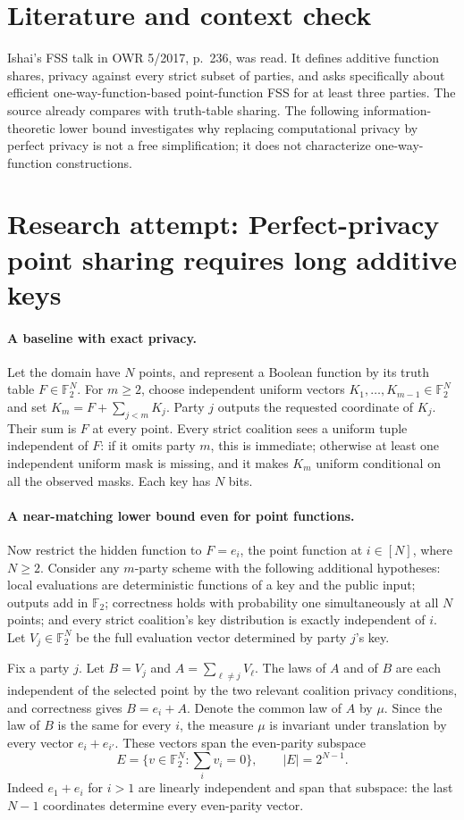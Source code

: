 \documentclass[11pt]{article}
\begin{document}
\section{Literature and context check}
Ishai's FSS talk in OWR 5/2017, p.~236, was read. It defines additive function shares, privacy against every strict subset of parties, and asks specifically about efficient one-way-function-based point-function FSS for at least three parties. The source already compares with truth-table sharing. The following information-theoretic lower bound investigates why replacing computational privacy by perfect privacy is not a free simplification; it does not characterize one-way-function constructions.
\section{Research attempt: Perfect-privacy point sharing requires long additive keys}

\paragraph{A baseline with exact privacy.}
Let the domain have $N$ points, and represent a Boolean function by its truth table $F\in\mathbb F_2^N$. For $m\ge2$, choose independent uniform vectors $K_1,\ldots,K_{m-1}\in\mathbb F_2^N$ and set $K_m=F+\sum_{j<m}K_j$. Party $j$ outputs the requested coordinate of $K_j$. Their sum is $F$ at every point. Every strict coalition sees a uniform tuple independent of $F$: if it omits party $m$, this is immediate; otherwise at least one independent uniform mask is missing, and it makes $K_m$ uniform conditional on all the observed masks. Each key has $N$ bits.

\paragraph{A near-matching lower bound even for point functions.}
Now restrict the hidden function to $F=e_i$, the point function at $i\in[N]$, where $N\ge2$. Consider any $m$-party scheme with the following additional hypotheses: local evaluations are deterministic functions of a key and the public input; outputs add in $\mathbb F_2$; correctness holds with probability one simultaneously at all $N$ points; and every strict coalition's key distribution is exactly independent of $i$. Let $V_j\in\mathbb F_2^N$ be the full evaluation vector determined by party $j$'s key.

Fix a party $j$. Let $B=V_j$ and $A=\sum_{\ell\ne j}V_\ell$. The laws of $A$ and of $B$ are each independent of the selected point by the two relevant coalition privacy conditions, and correctness gives $B=e_i+A$. Denote the common law of $A$ by $\mu$. Since the law of $B$ is the same for every $i$, the measure $\mu$ is invariant under translation by every vector $e_i+e_{i'}$. These vectors span the even-parity subspace
\[
 E=\{v\in\mathbb F_2^N:\sum_i v_i=0\},\qquad |E|=2^{N-1}.
\]
Indeed $e_1+e_i$ for $i>1$ are linearly independent and span that subspace: the last $N-1$ coordinates determine every even-parity vector.
\end{document}
